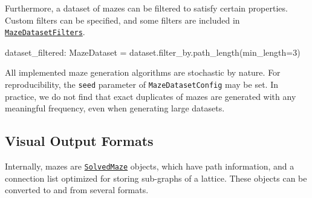 \documentclass[10pt,a4paper,onecolumn]{article}
\newenvironment{Shaded}{}{}
\newcommand{\DecValTok}[1]{\textcolor[rgb]{0.25,0.63,0.44}{#1}}
\newcommand{\NormalTok}[1]{#1}
\newcommand{\OperatorTok}[1]{\textcolor[rgb]{0.40,0.40,0.40}{#1}}
\begin{document}
Furthermore, a dataset of mazes can be filtered to satisfy certain
properties. Custom filters can be specified, and some filters are
included in
\href{https://understanding-search.github.io/maze-dataset/maze_dataset/dataset/filters.html\#MazeDatasetFilters}{\texttt{MazeDatasetFilters}}.

\begin{Shaded}
\begin{Highlighting}[]
\NormalTok{dataset\_filtered: MazeDataset }\OperatorTok{=}\NormalTok{ dataset.filter\_by.path\_length(min\_length}\OperatorTok{=}\DecValTok{3}\NormalTok{)}
\end{Highlighting}
\end{Shaded}

All implemented maze generation algorithms are stochastic by nature. For
reproducibility, the \texttt{seed} parameter of
\texttt{MazeDatasetConfig} may be set. In practice, we do not find that
exact duplicates of mazes are generated with any meaningful frequency,
even when generating large datasets.

\hypertarget{visual-output-formats}{%
\subsection{Visual Output Formats}\label{visual-output-formats}}

Internally, mazes are
\href{https://understanding-search.github.io/maze-dataset/maze_dataset.html\#SolvedMaze}{\texttt{SolvedMaze}}
objects, which have path information, and a connection list optimized
for storing sub-graphs of a lattice. These objects can be converted to
and from several formats.
\end{document}
